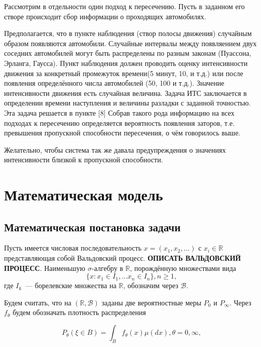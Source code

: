 \documentclass[a4paper,14pt]{article}
\begin{document}
Рассмотрим в отдельности один подход к пересечению. Пусть в заданном его створе происходит сбор информации о проходящих автомобилях. 

Предполагается, что в пункте наблюдения (створ полосы движения) случайным образом появляются автомобили. Случайные интервалы между появляением двух соседних автомобилей могут быть распределены по разным законам (Пуассона, Эрланга, Гаусса). Пункт наблюдения должен проводить оценку интенсивности движения за конкретный промежуток времени(5 минут, 10, и т.д.) или после появления определённого числа автомобилей (50, 100 и т.д.). Значение интенсивности движения есть случайная величина. Задача ИТС заключается в определении времени наступления и величины разладки с заданной точностью. Эта задача решается в пункте [8]
Собрав такого рода информацию на всех подходах к пересечению определяется вероятность появления заторов, т.е. превышения пропускной способности пересечения, о чём говорилось выше.

Желательно, чтобы система так же давала предупреждения о значениях интенсивности близкой к пропускной способности.

\section{Математическая модель}

\subsection{Математическая постановка задачи}

Пусть имеется числовая последовательность $x = (x_1, x_2, ...)$ с $x_i \in \mathbb{R}$ представляющая собой Вальдовский процесс. \textbf{ОПИСАТЬ ВАЛЬДОВСКИЙ ПРОЦЕСС}. Наименьшую $\sigma$-алгебру в $\mathbb{R}$, порождённую множествами вида
\begin{displaymath}
  \{ x: x_1 \in I_1, ... x_n \in I_n \}, n \ge 1,
\end{displaymath}
где $I_k$~--- борелевские множества на $\mathbb{R}$, обозначим через $\mathcal{B}$. 

Будем считать, что на $(\mathbb{R}, \mathcal{B})$ заданы две вероятностные меры $P_0$ и $P_\infty$. Через $f_\theta$ будем обозначать плотность распределения 

\begin{displaymath}
  P_\theta(\xi \in B) = \int_B f_\theta(x)\mu(dx), \theta = 0, \infty,
\end{displaymath}
\end{document}
